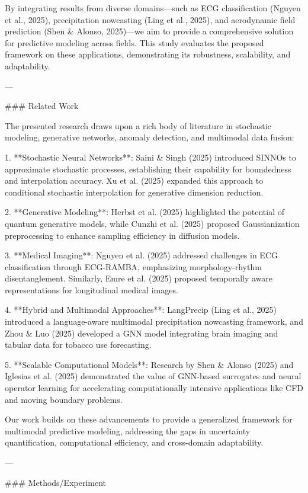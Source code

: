By integrating results from diverse domains—such as ECG classification (Nguyen et al., 2025), precipitation nowcasting (Ling et al., 2025), and aerodynamic field prediction (Shen & Alonso, 2025)—we aim to provide a comprehensive solution for predictive modeling across fields. This study evaluates the proposed framework on these applications, demonstrating its robustness, scalability, and adaptability.

---

### Related Work

The presented research draws upon a rich body of literature in stochastic modeling, generative networks, anomaly detection, and multimodal data fusion:

1. **Stochastic Neural Networks**: Saini & Singh (2025) introduced SINNOs to approximate stochastic processes, establishing their capability for boundedness and interpolation accuracy. Xu et al. (2025) expanded this approach to conditional stochastic interpolation for generative dimension reduction.

2. **Generative Modeling**: Herbst et al. (2025) highlighted the potential of quantum generative models, while Cunzhi et al. (2025) proposed Gaussianization preprocessing to enhance sampling efficiency in diffusion models.

3. **Medical Imaging**: Nguyen et al. (2025) addressed challenges in ECG classification through ECG-RAMBA, emphasizing morphology-rhythm disentanglement. Similarly, Emre et al. (2025) proposed temporally aware representations for longitudinal medical images.

4. **Hybrid and Multimodal Approaches**: LangPrecip (Ling et al., 2025) introduced a language-aware multimodal precipitation nowcasting framework, and Zhou & Luo (2025) developed a GNN model integrating brain imaging and tabular data for tobacco use forecasting.

5. **Scalable Computational Models**: Research by Shen & Alonso (2025) and Iglesias et al. (2025) demonstrated the value of GNN-based surrogates and neural operator learning for accelerating computationally intensive applications like CFD and moving boundary problems.

Our work builds on these advancements to provide a generalized framework for multimodal predictive modeling, addressing the gaps in uncertainty quantification, computational efficiency, and cross-domain adaptability.

---

### Methods/Experiment


